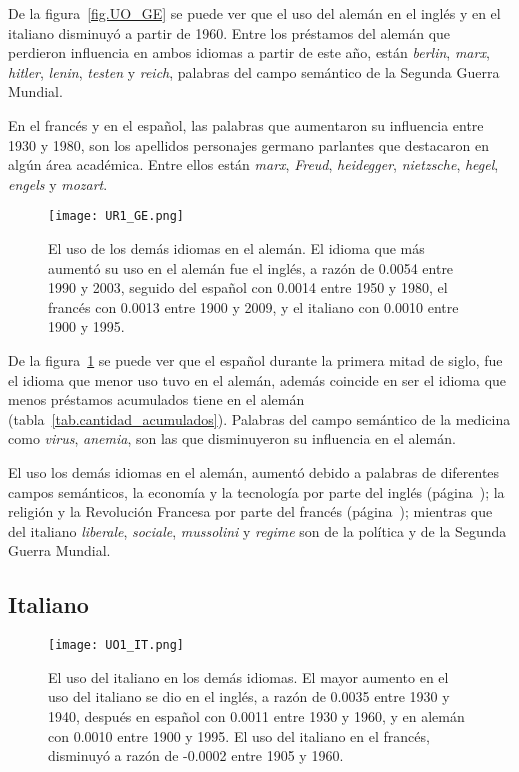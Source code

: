 De la figura~\ref{fig.UO_GE} se puede ver que el uso del alemán en el
inglés y en el italiano disminuyó a partir de 1960. Entre los préstamos del alemán que perdieron influencia en ambos idiomas a partir de este año, están \textit{berlin}, \textit{marx}, \textit{hitler}, \textit{lenin}, \textit{testen} y \textit{reich}, palabras del campo semántico de la Segunda Guerra Mundial. 

En el francés y en el español, las palabras que aumentaron su influencia entre 1930 y 1980,  son los apellidos personajes germano parlantes que destacaron en algún área académica. Entre ellos están \textit{marx}, \textit{Freud}, \textit{heidegger}, \textit{nietzsche}, \textit{hegel}, \textit{engels} y \textit{mozart}.

\label{GE-D}


\begin{figure}[h!]
	\centering
	\texttt{[image: UR1\_GE.png]}
	\caption{El uso de los demás idiomas en el alemán. El idioma que más aumentó su uso en el alemán fue el inglés, a razón de 0.0054   entre 1990 y 2003, seguido del español con 0.0014 entre 1950 y 1980, el francés con 0.0013 entre 1900 y 2009, y el italiano con 0.0010 entre 1900 y 1995.}
	\label{fig.UR_GE}
\end{figure}

De la figura~\ref{fig.UR_GE} se puede ver que el español durante la primera mitad de siglo, fue el idioma que menor uso tuvo en el alemán, además coincide en ser el idioma que menos préstamos acumulados tiene en el alemán (tabla~\ref{tab.cantidad_acumulados}). Palabras del campo semántico de la medicina como \textit{virus}, \textit{anemia}, son las que disminuyeron su influencia en el alemán. 

El uso los demás idiomas en el alemán, aumentó debido a palabras de diferentes campos semánticos, la  economía y la tecnología  por parte del inglés (página~\pageref{EN-D}); la religión y la Revolución Francesa por parte del francés (página~\pageref{FR-D}); mientras que del italiano 
\textit{liberale}, \textit{sociale}, \textit{mussolini} y  \textit{regime} 
son de la política y  de la Segunda Guerra Mundial.

\label{D-GE}

\subsection{Italiano} %

\begin{figure}[h!]
	\centering
	\texttt{[image: UO1\_IT.png]}
	\caption{El uso del italiano en los demás idiomas. El mayor aumento en el uso del italiano se dio en el inglés, a razón de 0.0035 entre 1930 y 1940, después en español con 0.0011 entre 1930 y 1960, y en alemán con 0.0010 entre 1900 y 1995. El uso del italiano en el francés, disminuyó a razón de -0.0002  entre 1905 y 1960.}
	\label{fig.UO_IT}
\end{figure}
	
